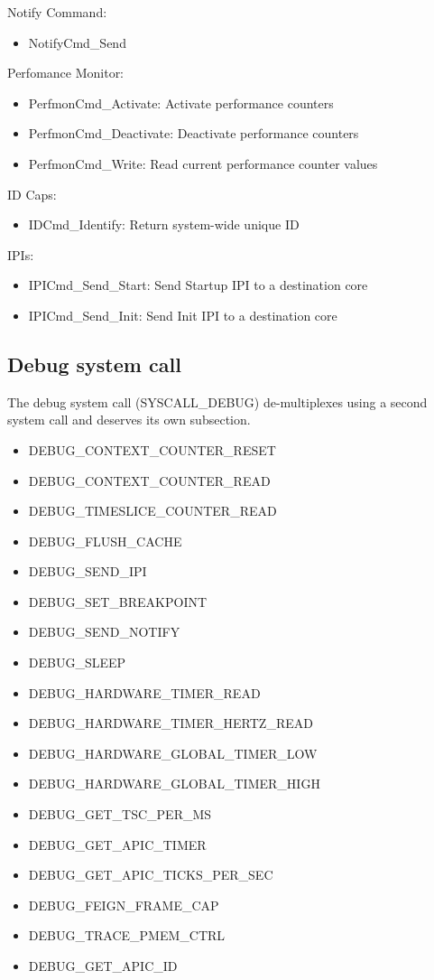 \documentclass[a4paper,11pt,twoside]{report}
\begin{document}
{{Notify Command:
\begin{itemize}
\item NotifyCmd\_Send
\end{itemize}

Perfomance Monitor:
\begin{itemize}
\item PerfmonCmd\_Activate: Activate performance counters
\item PerfmonCmd\_Deactivate: Deactivate performance counters
\item PerfmonCmd\_Write: Read current performance counter values
\end{itemize}

ID Caps:
\begin{itemize}
\item IDCmd\_Identify: Return system-wide unique ID
\end{itemize}

IPIs:
\begin{itemize}
\item IPICmd\_Send\_Start: Send Startup IPI to a destination core
\item IPICmd\_Send\_Init: Send Init IPI to a destination core
\end{itemize}

\subsection{Debug system call}

The debug system call (SYSCALL\_DEBUG) de-multiplexes using a second system
call and deserves its own subsection.

\begin{itemize}
\item DEBUG\_CONTEXT\_COUNTER\_RESET
\item DEBUG\_CONTEXT\_COUNTER\_READ
\item DEBUG\_TIMESLICE\_COUNTER\_READ
\item DEBUG\_FLUSH\_CACHE
\item DEBUG\_SEND\_IPI
\item DEBUG\_SET\_BREAKPOINT
\item DEBUG\_SEND\_NOTIFY
\item DEBUG\_SLEEP
\item DEBUG\_HARDWARE\_TIMER\_READ
\item DEBUG\_HARDWARE\_TIMER\_HERTZ\_READ
\item DEBUG\_HARDWARE\_GLOBAL\_TIMER\_LOW
\item DEBUG\_HARDWARE\_GLOBAL\_TIMER\_HIGH
\item DEBUG\_GET\_TSC\_PER\_MS
\item DEBUG\_GET\_APIC\_TIMER
\item DEBUG\_GET\_APIC\_TICKS\_PER\_SEC
\item DEBUG\_FEIGN\_FRAME\_CAP
\item DEBUG\_TRACE\_PMEM\_CTRL
\item DEBUG\_GET\_APIC\_ID
\end{itemize}

}}
\end{document}
